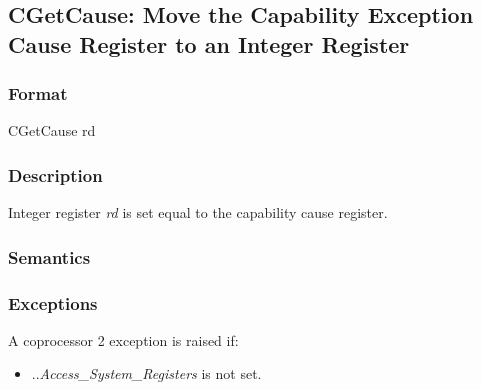 \clearpage
{}
{}
\subsection*{CGetCause: Move the Capability Exception Cause Register to an Integer Register}

\subsubsection*{Format}

CGetCause rd

\begin{center}
\end{center}

\subsubsection*{Description}

Integer register \textit{rd} is set equal to the capability cause register.

\subsubsection*{Semantics}

\subsubsection*{Exceptions}

A coprocessor 2 exception is raised if:

\begin{itemize}
\item
\PCC{}.\cperms{}.\emph{Access\_System\_Registers} is not set.
\end{itemize}
